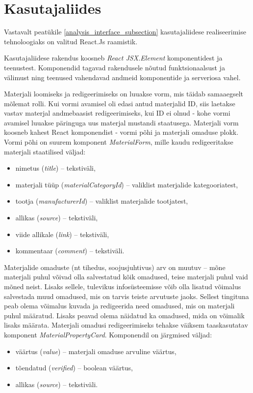 \section{Kasutajaliides}
Vastavalt peatükile \ref{analysis_interface_subsection} kasutajaliidese realiseerimise tehnoloogiaks
on valitud React.Js raamistik.

Kasutajaliidese rakendus koosneb \textit{React JSX.Element} komponentidest ja teenustest.
Komponendid tagavad rakendusele nõutud funktsionaalsust ja välimust ning teenused vahendavad andmeid komponentide 
ja serveriosa vahel.

Materjali loomiseks ja redigeerimiseks on luuakse vorm, mis täidab samaaegselt mõlemat rolli. 
Kui vormi avamisel oli edasi antud materjalid ID, siis laetakse vastav materjal andmebaasist redigeerimiseks, 
kui ID ei olnud - kohe vormi avamisel luuakse päringuga uus materjal mustandi staatusega.
Materjali vorm koosneb kahest React komponendist - vormi põhi ja materjali omaduse plokk.
Vormi põhi on suurem komponent \textit{MaterialForm}, mille kaudu redigeeritakse materjali staatilised 
väljad:

\begin{itemize}
    \item nimetus (\textit{title}) -- tekstiväli,
    \item materjali tüüp (\textit{materialCategoryId}) -- valiklist materjalide kategooriatest, 
    \item tootja (\textit{manufacturerId}) -- valiklist materjalide tootjatest,
    \item allikas (\textit{source}) -- tekstiväli,
    \item viide allikale (\textit{link}) -- tekstiväli,
    \item kommentaar (\textit{comment}) -- tekstiväli.
\end{itemize}

Materjalide omaduste (nt tihedus, soojusjuhtivus) arv on muutuv -- mõne materjali puhul võivad olla salvestatud
kõik omadused, teise materjali puhul vaid mõned neist. Lisaks sellele, tulevikus infosüsteemisse võib olla lisatud
võimalus salvestada muud omadused, mis on tarvis teiste arvutuste jaoks. Sellest tingituna peab olema võimalus kuvada
ja redigeerida need omadused, mis on materjali puhul määratud. Lisaks peavad olema näidatud ka omadused,
mida on võimalik lisaks määrata. Materjali omadusi redigeerimiseks tehakse väiksem taaskasutatav 
komponent \textit{MaterialPropertyCard}. Komponendil on järgmised väljad:
\begin{itemize}
    \item väärtus (\textit{value}) -- materjali omaduse arvuline väärtus,
    \item tõendatud (\textit{verified}) -- boolean väärtus,
    \item allikas (\textit{source}) -- tekstiväli.
\end{itemize}

